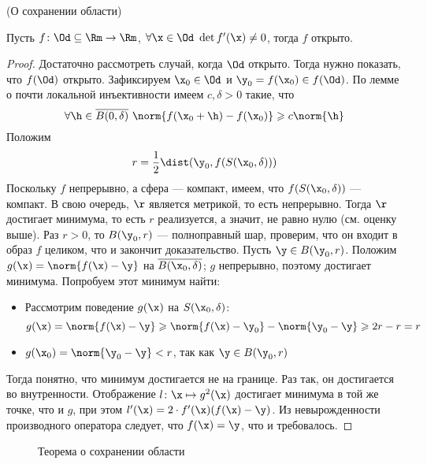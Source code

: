 \begin{theorem}(О сохранении области)

    Пусть $f \colon \Od \subseteq \Rm \to \Rm$, $\forall \x \in \Od~ \det{f'(\x)}
    \neq 0$, тогда $f$ открыто.
\end{theorem}
\begin{proof}
    Достаточно рассмотреть случай, когда $\Od$ открыто. Тогда нужно показать, что
    $f(\Od)$ открыто. Зафиксируем $\x_0 \in \Od$ и $\y_0 = f(\x_0) \in f(\Od)$.
    По лемме о почти локальной инъективности имеем $c, \delta > 0$ такие, что
\[
    \forall \h \in \overline{B(0, \delta)}~ \norm{f(\x_0 + \h) - f(\x_0)}
    \geqslant c \norm{\h}
\]
    Положим
\[
    r = \frac{1}{2}\dist(\y_0, f(S(\x_0, \delta)))
\]
    Поскольку $f$ непрерывно, а сфера --- компакт, имеем, что $f(S(\x_0, \delta))$
    --- компакт. В свою очередь, $\r$ является метрикой, то есть непрерывно. Тогда
    $\r$ достигает минимума, то есть $r$ реализуется, а значит, не равно нулю
    (см. оценку выше). Раз $r > 0$, то $B(\y_0, r)$ --- полноправный шар,
    проверим, что он входит в образ $f$ целиком, что и закончит доказательство.
    Пусть $\y \in B(\y_0, r)$. Положим $g(\x) = \norm{f(\x) - \y}$ на
    $\overline{B(\x_0, \delta)}$; $g$ непрерывно, поэтому достигает минимума.
    Попробуем этот минимум найти:
\begin{itemize}
    \item Рассмотрим поведение $g(\x)$ на $S(\x_0, \delta)$:
\[
    g(\x) = \norm{f(\x) - \y} \geqslant \norm{f(\x) - \y_0} - \norm{\y_0 - \y}
    \geqslant 2r - r = r
\]
    \item $g(\x_0) = \norm{\y_0 - \y} < r$, так как $\y \in B(\y_0, r)$
\end{itemize}
    Тогда понятно, что минимум достигается не на границе. Раз так, он достигается
    во внутренности. Отображение $l\colon \x \mapsto g^2(\x)$ достигает минимума в
    той же точке, что и $g$, при этом $l'(\x) = 2 \cdot f'(\x)(f(\x) - \y)$. Из
    невырожденности производного оператора следует, что $f(\x) = \y$, что и
    требовалось.
\end{proof}

\begin{figure}[ht]
    \centering
    \caption{Теорема о сохранении области}
\end{figure}

